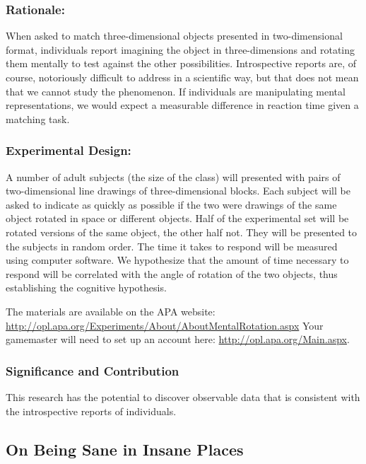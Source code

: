 \begin{refsection}
\subsubsection{Rationale:}
\label{rationale:}

When asked to match three-dimensional objects presented in two-dimensional format, individuals report imagining the object in three-dimensions and rotating them mentally to test against the other possibilities. Introspective reports are, of course, notoriously difficult to address in a scientific way, but that does not mean that we cannot study the phenomenon. If individuals are manipulating mental representations, we would expect a measurable difference in reaction time given a matching task.

\subsubsection{Experimental Design:}
\label{experimentaldesign:}

A number of adult subjects (the size of the class) will presented with pairs of two-dimensional line drawings of three-dimensional blocks. Each subject will be asked to indicate as quickly as possible if the two were drawings of the same object rotated in space or different objects. Half of the experimental set will be rotated versions of the same object, the other half not. They will be presented to the subjects in random order. The time it takes to respond will be measured using computer software. We hypothesize that the amount of time necessary to respond will be correlated with the angle of rotation of the two objects, thus establishing the cognitive hypothesis.

The materials are available on the APA website: \url{http://opl.apa.org/Experiments/About/AboutMentalRotation.aspx} Your gamemaster will need to set up an account here: \url{http://opl.apa.org/Main.aspx}.

\subsubsection{Significance and Contribution}
\label{significanceandcontribution}

This research has the potential to discover observable data that is consistent with the introspective reports of individuals. 

\newpage

\subsection{On Being Sane in Insane Places}
\label{onbeingsaneininsaneplaces}


\end{refsection}
